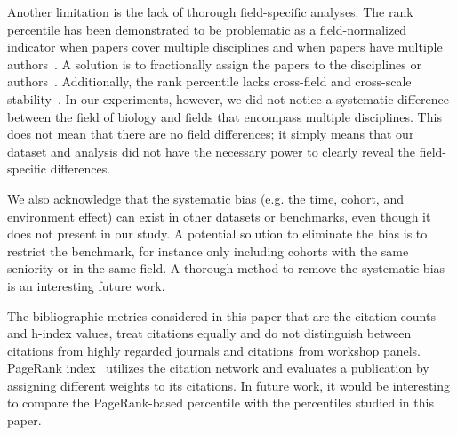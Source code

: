 Another limitation is the lack of thorough field-specific analyses. The rank percentile has been demonstrated to be problematic as a field-normalized indicator when papers cover multiple disciplines and when papers have multiple authors~\cite{bornmann2020evaluation}. A solution is to fractionally assign the papers to the disciplines or authors~\cite{waltman2011towards,waltman2015field}. Additionally, the rank percentile lacks cross-field and cross-scale stability~\cite{zitt2005relativity}. In our experiments, however, we did not notice a systematic difference between the field of biology and fields that encompass multiple disciplines. This does not mean that there are no field differences; it simply means that our dataset and analysis did not have the necessary power to clearly reveal the field-specific differences.

We also acknowledge that the systematic bias (e.g. the time, cohort, and environment effect) can exist in other datasets or benchmarks, even though it does not present in our study. A potential solution to eliminate the bias is to restrict the benchmark, for instance only including cohorts with the same seniority or in the same field. A thorough method to remove the systematic bias is an interesting future work.

The bibliographic metrics considered in this paper that are the citation counts and h-index values, treat citations equally and do not distinguish between citations from highly regarded journals and citations from workshop panels. PageRank index~\cite{chen2007finding,walker2007ranking,ma2008bringing} utilizes the citation network and evaluates a publication by assigning different weights to its citations. In future work, it would be interesting to compare the PageRank-based percentile with the percentiles studied in this paper. 